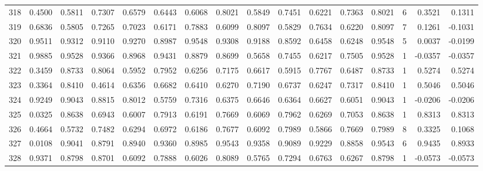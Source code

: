 \begin{tabular}{lrrrrrrrrrrrrrrr}
318 &      0.4500 &  0.5811 &  0.7307 &  0.6579 &  0.6443 &  0.6068 &  0.8021 &  0.5849 &  0.7451 &  0.6221 &   0.7363 &     0.8021 &      6 &                    0.3521 &                     0.1311 \\
319 &      0.6836 &  0.5805 &  0.7265 &  0.7023 &  0.6171 &  0.7883 &  0.6099 &  0.8097 &  0.5829 &  0.7634 &   0.6220 &     0.8097 &      7 &                    0.1261 &                    -0.1031 \\
320 &      0.9511 &  0.9312 &  0.9110 &  0.9270 &  0.8987 &  0.9548 &  0.9308 &  0.9188 &  0.8592 &  0.6458 &   0.6248 &     0.9548 &      5 &                    0.0037 &                    -0.0199 \\
321 &      0.9885 &  0.9528 &  0.9366 &  0.8968 &  0.9431 &  0.8879 &  0.8699 &  0.5658 &  0.7455 &  0.6217 &   0.7505 &     0.9528 &      1 &                   -0.0357 &                    -0.0357 \\
322 &      0.3459 &  0.8733 &  0.8064 &  0.5952 &  0.7952 &  0.6256 &  0.7175 &  0.6617 &  0.5915 &  0.7767 &   0.6487 &     0.8733 &      1 &                    0.5274 &                     0.5274 \\
323 &      0.3364 &  0.8410 &  0.4614 &  0.6356 &  0.6682 &  0.6410 &  0.6270 &  0.7190 &  0.6737 &  0.6247 &   0.7317 &     0.8410 &      1 &                    0.5046 &                     0.5046 \\
324 &      0.9249 &  0.9043 &  0.8815 &  0.8012 &  0.5759 &  0.7316 &  0.6375 &  0.6646 &  0.6364 &  0.6627 &   0.6051 &     0.9043 &      1 &                   -0.0206 &                    -0.0206 \\
325 &      0.0325 &  0.8638 &  0.6943 &  0.6007 &  0.7913 &  0.6191 &  0.7669 &  0.6069 &  0.7962 &  0.6269 &   0.7053 &     0.8638 &      1 &                    0.8313 &                     0.8313 \\
326 &      0.4664 &  0.5732 &  0.7482 &  0.6294 &  0.6972 &  0.6186 &  0.7677 &  0.6092 &  0.7989 &  0.5866 &   0.7669 &     0.7989 &      8 &                    0.3325 &                     0.1068 \\
327 &      0.0108 &  0.9041 &  0.8791 &  0.8940 &  0.9360 &  0.8985 &  0.9543 &  0.9358 &  0.9089 &  0.9229 &   0.8858 &     0.9543 &      6 &                    0.9435 &                     0.8933 \\
328 &      0.9371 &  0.8798 &  0.8701 &  0.6092 &  0.7888 &  0.6026 &  0.8089 &  0.5765 &  0.7294 &  0.6763 &   0.6267 &     0.8798 &      1 &                   -0.0573 &                    -0.0573 \\

\end{tabular}
